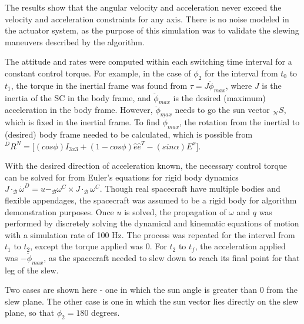 \documentclass[letterpaper, preprint, paper,11pt]{AAS}	%
\begin{document}
	
	The results show that the angular velocity and acceleration never exceed the velocity and acceleration constraints for any axis. There is no noise modeled in the actuator system, as the purpose of this simulation was to validate the slewing maneuvers described by the algorithm.
	
	The attitude and rates were computed within each switching time interval for a constant control torque. For example, in the case of $\phi_2$ for the interval from $t_0$ to $t_1$, the torque in the inertial frame was found from $\tau = J \ddot{\phi}_{max}$, where $J$ is the inertia of the SC in the body frame, and $\ddot{\phi}_{max}$ is the desired (maximum) acceleration in the body frame. However, $\ddot{\phi}_{max}$ needs to go the sun vector $_\mathcal{N}S$, which is fixed in the inertial frame. To find $\ddot{\phi}_{max}$, the rotation from the inertial to (desired) body frame needed to be calculated, which is possible from $ {}^DR^N = \big[(cos\phi)I_{3x3} + (1 - cos\phi)\hat{e}\hat{e}^T - (sin\alpha)E^x \big] $. 
	
	With the desired direction of acceleration known, the necessary control torque can be solved for from Euler's equations for rigid body dynamics $	J \cdot _\mathcal{B}\dot{\omega}^D = u - _\mathcal{B}\omega^C \times J \cdot _\mathcal{B}\omega^C	$. Though real spacecraft have multiple bodies and flexible appendages, the spacecraft was assumed to be a rigid body for algorithm demonstration purposes. Once $u$ is solved, the propagation of $\omega$ and $q$ was performed by discretely solving the dynamical and kinematic equations of motion with a simulation rate of 100 Hz. The process was repeated for the interval from $t_1$ to $t_2$, except the torque applied was 0. For $t_2$ to $t_f$, the acceleration applied was $-\ddot{\phi}_{max}$, as the spacecraft needed to slew down to reach its final point for that leg of the slew. 
	
	Two cases are shown here - one in which the sun angle is greater than 0 from the slew plane. The other case is one in which the sun vector lies directly on the slew plane, so that $\phi_2 = 180$ degrees. 
		
\end{document}
